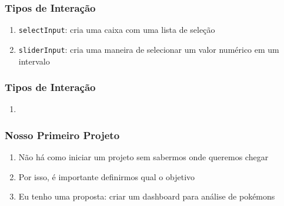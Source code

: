 \documentclass[12pt, compress, usetitleprogressbar]{beamer}\usepackage[]{graphicx}\usepackage[]{color}
\begin{document}






\begin{frame}

\frametitle{Tipos de Interação}

\begin{enumerate}[label=$\bullet$, leftmargin=*]

  \item \texttt{selectInput}: cria uma caixa com uma lista de seleção

  \item \texttt{sliderInput}: cria uma maneira de selecionar um valor numérico em um intervalo
  
\end{enumerate}

\end{frame}







\begin{frame}

\frametitle{Tipos de Interação}

\begin{enumerate}[label=$\bullet$, leftmargin=*]

  \item 
  
\end{enumerate}

\end{frame}





















\begin{frame}

\frametitle{Nosso Primeiro Projeto}

\begin{enumerate}[label=$\bullet$, leftmargin=*]

  \item Não há como iniciar um projeto sem sabermos onde queremos chegar

  \item Por isso, é importante definirmos qual o objetivo 

  \item Eu tenho uma proposta: criar um dashboard para análise de pokémons

\end{enumerate}

\end{frame}
\end{document}
